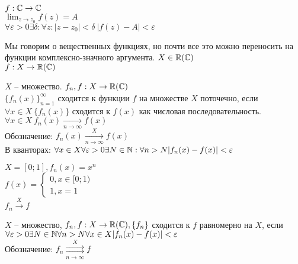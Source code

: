 
\begin{Def}
	$f: \mathbb{C} \to \mathbb{C}$\\
	$\displaystyle \lim_{z \to z_0} f(z) = A$\\
	$\forall \varepsilon > 0 \exists \delta: \forall z: |z - z_0| < \delta \ |f(z) - A| < \varepsilon$
\end{Def} 

\begin{Rem}
	Мы говорим о вещественных функциях, но почти все это можно переносить на функции
	комплексно-значного аргумента. 
	$X \in \mathbb{R} (\mathbb{C})$\\
	$f: X \to \mathbb{R} (\mathbb{C})$
\end{Rem}

\begin{Def} 
	$X$ -- множество. $f_n, f: X \to \mathbb{R} (\mathbb{C})$\\
	$\{f_n(x)\}_{n=1}^{\infty}$ сходится к функции $f$ на множестве $X$ поточечно, если 
	$\forall x \in X \ \{f_n(x)\}$ сходится к $f(x)$ как числовая последовательность.\\
	$\forall x \in X \ f_n (x) \underset{n \to \infty}{\to} f(x)$\\
	Обозначение: $f_n (x) \underset{n \to \infty}{\overset{X}{\to}} f(x)$\\
	В кванторах: $\forall x \in X \forall \varepsilon > 0 \exists N \in \mathbb{N}: \forall n > N |f_n(x) - f(x)| < \varepsilon$
\end{Def} 

\begin{Example}
	$X = [0;1], f_n(x) = x^n$\\
	$f(x) = \begin{cases}
		0, x \in [0; 1)\\
		1, x = 1
	\end{cases}$\\ 
	$f_n \overset{X}{\to} f$
\end{Example}

\begin{Def}
	$X$ -- множество, $f_n, f: X \to \mathbb{R} (\mathbb{C}),\\
	\{f_n\}$ сходится к $f$ равномерно на $X$, если 
	$\forall \varepsilon> 0 \exists N \in \mathbb{N} \forall n > N \forall x \in X |f_n(x) - f(x)| < \varepsilon$\\
	Обозначение: $f_n \underset{n \to \infty}{\overset{X}{\rightrightarrows}} f$
\end{Def}

